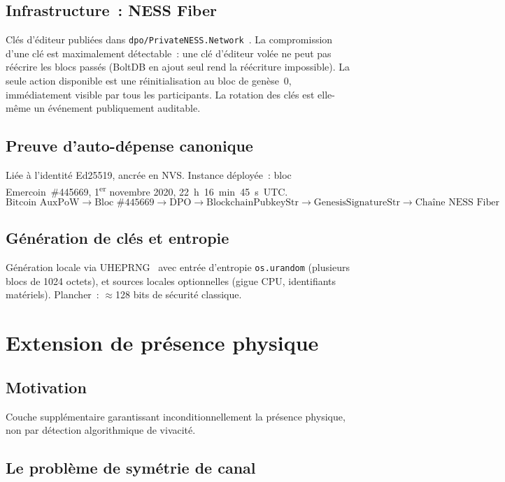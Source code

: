 \documentclass[11pt,a4paper]{article}
\theoremstyle{definition}
\begin{document}
\subsection{Infrastructure~: NESS Fiber}

Clés d'éditeur publiées dans \texttt{dpo/PrivateNESS.Network}~\cite{DPO}.
La compromission d'une clé est maximalement détectable~: une clé d'éditeur volée ne peut pas réécrire les blocs passés (BoltDB en ajout seul rend la réécriture impossible). La seule action disponible est une réinitialisation au bloc de genèse~0, immédiatement visible par tous les participants. La rotation des clés est elle-même un événement publiquement auditable.

\subsection{Preuve d'auto-dépense canonique}

Liée à l'identité Ed25519, ancrée en NVS. Instance déployée~:
bloc Emercoin~\#445669, 1\textsuperscript{er} novembre 2020,
22~h~16~min~45~s~UTC.
\[
\text{Bitcoin AuxPoW}
\to \text{Bloc \#445669}
\to \text{DPO}
\to \text{BlockchainPubkeyStr}
\to \text{GenesisSignatureStr}
\to \text{Chaîne NESS Fiber}
\]

\subsection{Génération de clés et entropie}

Génération locale via UHEPRNG~\cite{Gibson} avec entrée d'entropie
\texttt{os.urandom} (plusieurs blocs de 1024 octets), et sources
locales optionnelles (gigue CPU, identifiants matériels). Plancher~:
$\approx$128 bits de sécurité classique.

\section{Extension de présence physique}
\label{sec:physical}

\subsection{Motivation}

Couche supplémentaire garantissant inconditionnellement la présence
physique, non par détection algorithmique de vivacité.

\subsection{Le problème de symétrie de canal}
\end{document}
